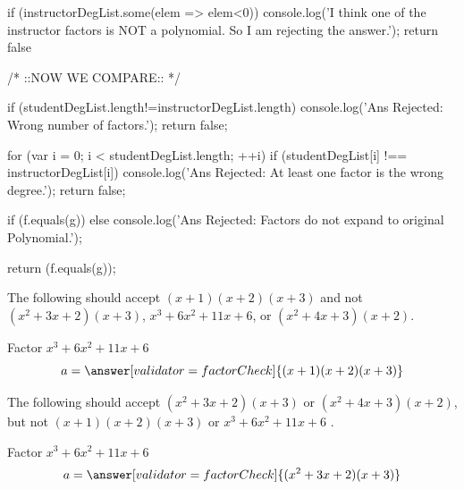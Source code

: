 \documentclass{ximera}
\begin{document}
\begin{javascript}
{    if (instructorDegList.some(elem => elem<0)) {
        console.log('I think one of the instructor factors is NOT a polynomial. So I am rejecting the answer.');
        return false
        }
     
   /*
        ::NOW WE COMPARE::
   */
     
    if (studentDegList.length!=instructorDegList.length){
        console.log('Ans Rejected: Wrong number of factors.');
        return false;
        }
     
    for (var i = 0; i < studentDegList.length; ++i) {
        if (studentDegList[i] !== instructorDegList[i]) {
        console.log('Ans Rejected: At least one factor is the wrong degree.');
        return false;
        }
    }
 
    if (f.equals(g)){
        } else {
        console.log('Ans Rejected: Factors do not expand to original Polynomial.');
        }
 
    return (f.equals(g));
}
   
\end{javascript}



\begin{problem}
The following should accept $(x+1)(x+2)(x+3)$ and not $(x^2+3x+2)(x+3)$, $x^3 + 6x^2 + 11x + 6$, or $(x^2 + 4x + 3)(x+2)$.

Factor $x^3 + 6x^2 + 11x + 6$
\[
a=\answer[validator=factorCheck]{(x+1)(x+2)(x+3)}
\]

\end{problem}

\begin{problem}
The following should accept $(x^2 + 3x + 2)(x + 3)$ or $(x^2 + 4x + 3)(x + 2)$, but not $(x+1)(x+2)(x+3)$ or $x^3 + 6x^2 + 11x + 6$ .

Factor $x^3 + 6x^2 + 11x + 6$
\[
a=\answer[validator=factorCheck]{(x^2 + 3x + 2)(x + 3)}
\]

\end{problem}
\end{document}
